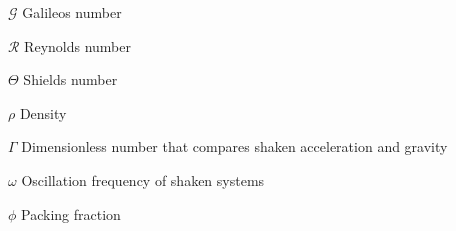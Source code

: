 
\begin{simbolos}
    \item[$\mathcal{G}$] Galileos number
    \item[$\mathcal{R}$] Reynolds number
    \item[$\Theta$] Shields number
    \item[$\rho$] Density
    \item[$\Gamma$] Dimensionless number that compares shaken acceleration and gravity
    \item[$\omega$] Oscillation frequency of shaken systems
    \item[$\phi$] Packing fraction
\end{simbolos}

